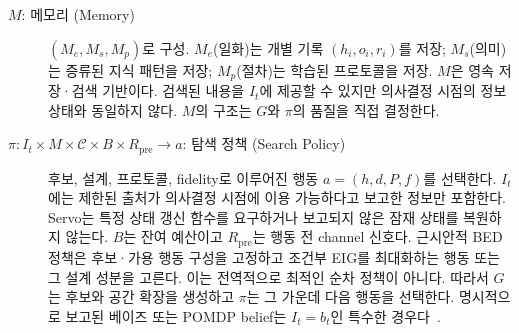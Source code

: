 \documentclass[11pt]{article}
\begin{document}
\begin{description}
  \item[$M$: 메모리 (Memory)] $(M_e, M_s, M_p)$로 구성. $M_e$(일화)는 개별 기록 $(h_i, o_i, r_i)$를 저장; $M_s$(의미)는 증류된 지식 패턴을 저장; $M_p$(절차)는 학습된 프로토콜을 저장. $M$은 영속 저장·검색 기반이다. 검색된 내용을 $I_t$에 제공할 수 있지만 의사결정 시점의 정보 상태와 동일하지 않다. $M$의 구조는 $G$와 $\pi$의 품질을 직접 결정한다.

  \item[$\pi: I_t \times M \times \mathcal C\times B\times R_{\mathrm{pre}} \rightarrow a$: 탐색 정책 (Search Policy)] 후보, 설계, 프로토콜, fidelity로 이루어진 행동 $a=(h,d,P,f)$를 선택한다. $I_t$에는 제한된 출처가 의사결정 시점에 이용 가능하다고 보고한 정보만 포함한다. Servo는 특정 상태 갱신 함수를 요구하거나 보고되지 않은 잠재 상태를 복원하지 않는다. $B$는 잔여 예산이고 $R_{\mathrm{pre}}$는 행동 전 channel 신호다. 근시안적 BED 정책은 후보·가용 행동 구성을 고정하고 조건부 EIG를 최대화하는 행동 또는 그 설계 성분을 고른다. 이는 전역적으로 최적인 순차 정책이 아니다. 따라서 $G$는 후보와 공간 확장을 생성하고 $\pi$는 그 가운데 다음 행동을 선택한다. 명시적으로 보고된 베이즈 또는 POMDP belief는 $I_t=b_t$인 특수한 경우다~\citep{kaelbling1998pomdp}.
\end{description}
\end{document}
